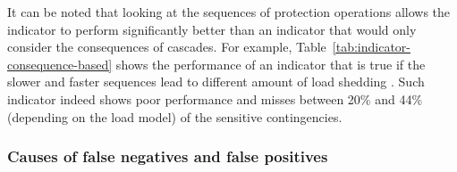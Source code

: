 %
%

It can be noted that looking at the sequences of protection operations allows the indicator to perform significantly better than an indicator that would only consider the consequences of cascades. For example, Table~\ref{tab:indicator-consequence-based} shows the performance of an indicator that is true if the slower and faster sequences lead to different amount of load shedding%
. Such indicator indeed shows poor performance and misses between 20\% and 44\% (depending on the load model) of the sensitive contingencies.


\subsubsection{Causes of false negatives and false positives}
\label{sec:causesOfInaccuracy}

